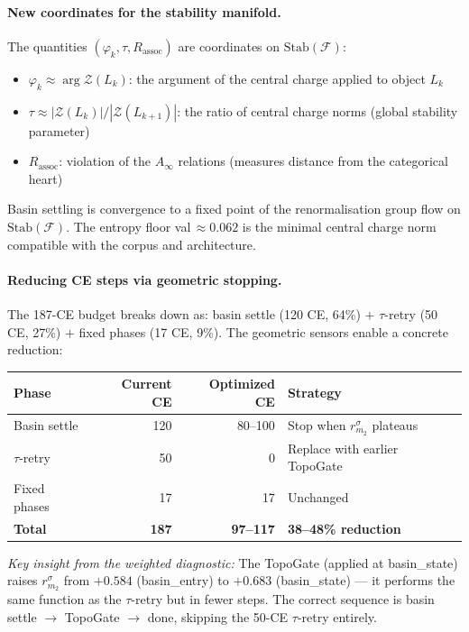 \documentclass[11pt]{amsart}
\begin{document}
\paragraph{New coordinates for the stability manifold.}
The quantities $(\varphi_k, \tau, R_\mathrm{assoc})$ are
coordinates on $\mathrm{Stab}(\mathcal{F})$:
\begin{itemize}
\item $\varphi_k \approx \arg \mathcal{Z}(L_k)$:
  the argument of the central charge applied to object $L_k$
\item $\tau \approx |\mathcal{Z}(L_k)|/|\mathcal{Z}(L_{k+1})|$:
  the ratio of central charge norms (global stability parameter)
\item $R_\mathrm{assoc}$: violation of the $A_\infty$ relations
  (measures distance from the categorical heart)
\end{itemize}
Basin settling is convergence to a fixed point of the renormalisation
group flow on $\mathrm{Stab}(\mathcal{F})$.
The entropy floor val\,$\approx 0.062$ is the minimal central charge
norm compatible with the corpus and architecture.

\paragraph{Reducing CE steps via geometric stopping.}

The 187-CE budget breaks down as:
basin settle (120 CE, 64\%) $+$ $\tau$-retry (50 CE, 27\%) $+$
fixed phases (17 CE, 9\%).
The geometric sensors enable a concrete reduction:

\begin{center}\small
\begin{tabular}{@{}lrrl@{}}
\toprule
Phase & Current CE & Optimized CE & Strategy \\
\midrule
Basin settle & 120 & 80--100 & Stop when $r_{m_2}^\sigma$ plateaus \\
$\tau$-retry & 50 & 0 & Replace with earlier TopoGate \\
Fixed phases & 17 & 17 & Unchanged \\
\midrule
\textbf{Total} & \textbf{187} & \textbf{97--117} & \textbf{38--48\% reduction} \\
\bottomrule
\end{tabular}
\end{center}

\emph{Key insight from the weighted diagnostic:}
The TopoGate (applied at basin\_state) raises $r_{m_2}^\sigma$ from
$+0.584$ (basin\_entry) to $+0.683$ (basin\_state) ---
it performs the same function as the $\tau$-retry but in fewer steps.
The correct sequence is basin settle $\to$ TopoGate $\to$ done,
skipping the 50-CE $\tau$-retry entirely.
\end{document}
